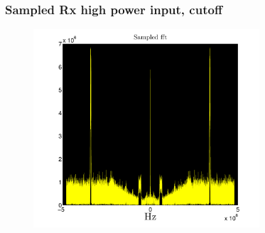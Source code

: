 \documentclass[11pt]{beamer} %
\begin{document}
\begin{frame}
  \frametitle{Sampled  Rx high power input, cutoff}
\begin{figure}
\includegraphics[width=0.75\textwidth]{Figures/SampledRxFftMattnad.pdf}
\end{figure}
\end{frame}
\end{document}
